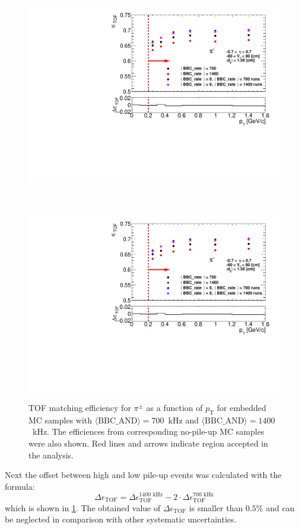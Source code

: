 \begin{figure}[h!]
	\centering
	\parbox{0.49\textwidth}{
		\centering
		\includegraphics[width=\linewidth,page=1]{chapters/chrgSTAR/img/tofEff/tofEffi_d0_1_5_etapt_1.pdf}\\
	}~
	\parbox{0.49\textwidth}{
		\centering
		\includegraphics[width=\linewidth,page=2]{chapters/chrgSTAR/img/tofEff/tofEffi_d0_1_5_etapt_1.pdf}\\
	}%
	\caption{TOF matching efficiency for $\pi^\pm$ as a function of $p_\textrm{T}$  for embedded MC samples with \mbox{$\langle\text{BBC\_AND}\rangle=700$~kHz} and \mbox{$\langle\text{BBC\_AND}\rangle=1400$~kHz}. The efficiences from corresponding no-pile-up MC samples were also shown. Red lines and arrows indicate region accepted in the analysis.}
	\label{fig:systError1Dtof}
\end{figure}

\noindent Next the offset between high and low pile-up events was calculated with the formula:
\begin{equation}
\Delta\epsilon_\textrm{TOF} =\Delta\epsilon_\textrm{TOF}^{1400\text{ kHz}}-2\cdot\Delta\epsilon_\textrm{TOF}^{700\text{ kHz}}
\label{eq:tofSystDifference}
\end{equation}
which is shown in \cref{fig:systError1Dtof}.  The obtained value of $\Delta\epsilon_\textrm{TOF}$ is  smaller than $0.5\%$ and can be neglected in comparison with other systematic uncertainties.


